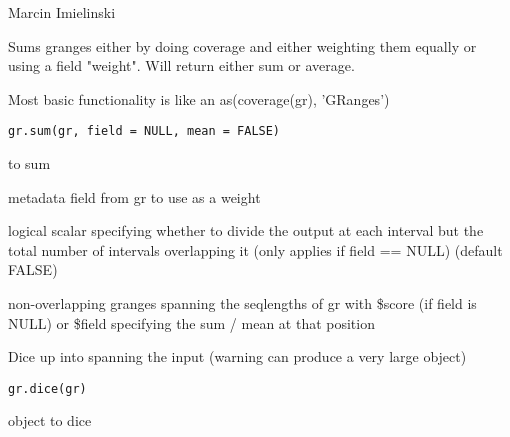 \documentclass[a4paper]{book}
\begin{document}
\begin{Author}\relax
Marcin Imielinski
\end{Author}
%
\begin{Description}\relax
Sums granges either by doing coverage and either weighting them equally
or using a field "weight".  Will return either sum or average.

Most basic functionality is like an as(coverage(gr), 'GRanges')
\end{Description}
%
\begin{Usage}
\begin{verbatim}
gr.sum(gr, field = NULL, mean = FALSE)
\end{verbatim}
\end{Usage}
%
\begin{Arguments}
\begin{ldescription}
\item[\code{gr}]  to sum

\item[\code{field}] metadata field from gr to use as a weight

\item[\code{mean}] logical scalar specifying whether to divide the output at each interval but the total number of intervals overlapping it (only applies if field == NULL) (default FALSE)
\end{ldescription}
\end{Arguments}
%
\begin{Value}
non-overlapping granges spanning the seqlengths of gr with \$score (if field is NULL) or \$field specifying the sum / mean at that position
\end{Value}
%
\begin{Description}\relax
Dice up  into   spanning the input (warning can produce a very large object)
\end{Description}
%
\begin{Usage}
\begin{verbatim}
gr.dice(gr)
\end{verbatim}
\end{Usage}
%
\begin{Arguments}
\begin{ldescription}
\item[\code{gr}]  object to dice
\end{ldescription}
\end{Arguments}
\end{document}
